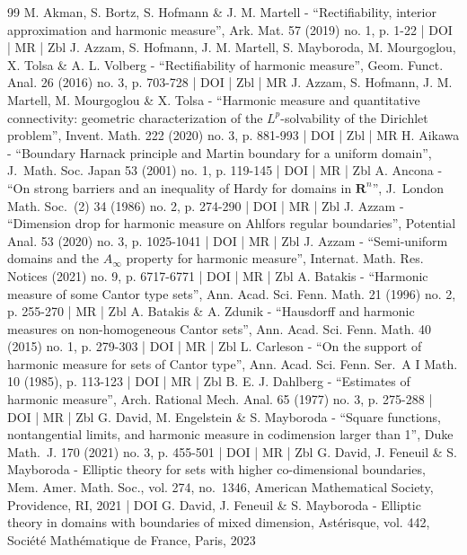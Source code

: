 \documentclass[10pt]{amsart}
\numberwithin{equation}{section}
\theoremstyle{plain}
\theoremstyle{definition}
\begin{document}
\begin{thebibliography}{99}
M. Akman, S. Bortz, S. Hofmann \& J. M. Martell - “Rectifiability, interior approximation and harmonic measure”, Ark. Mat. 57 (2019) no. 1, p. 1-22 | DOI | MR | Zbl
J. Azzam, S. Hofmann, J. M. Martell, S. Mayboroda, M. Mourgoglou, X. Tolsa \& A. L. Volberg - “Rectifiability of harmonic measure”, Geom. Funct. Anal. 26 (2016) no. 3, p. 703-728 | DOI | Zbl | MR
J. Azzam, S. Hofmann, J. M. Martell, M. Mourgoglou \& X. Tolsa - “Harmonic measure and quantitative connectivity: geometric characterization of the $L^p$-solvability of the Dirichlet problem”, Invent. Math. 222 (2020) no. 3, p. 881-993 | DOI | Zbl | MR
H. Aikawa - “Boundary Harnack principle and Martin boundary for a uniform domain”, J. Math. Soc. Japan 53 (2001) no. 1, p. 119-145 | DOI | MR | Zbl
A. Ancona - “On strong barriers and an inequality of Hardy for domains in ${\mathbf{R}}^n$”, J. London Math. Soc. (2) 34 (1986) no. 2, p. 274-290 | DOI | MR | Zbl
J. Azzam - “Dimension drop for harmonic measure on Ahlfors regular boundaries”, Potential Anal. 53 (2020) no. 3, p. 1025-1041 | DOI | MR | Zbl
J. Azzam - “Semi-uniform domains and the $A_\infty $ property for harmonic measure”, Internat. Math. Res. Notices (2021) no. 9, p. 6717-6771 | DOI | MR | Zbl
A. Batakis - “Harmonic measure of some Cantor type sets”, Ann. Acad. Sci. Fenn. Math. 21 (1996) no. 2, p. 255-270 | MR | Zbl
A. Batakis \& A. Zdunik - “Hausdorff and harmonic measures on non-homogeneous Cantor sets”, Ann. Acad. Sci. Fenn. Math. 40 (2015) no. 1, p. 279-303 | DOI | MR | Zbl
L. Carleson - “On the support of harmonic measure for sets of Cantor type”, Ann. Acad. Sci. Fenn. Ser. A I Math. 10 (1985), p. 113-123 | DOI | MR | Zbl
B. E. J. Dahlberg - “Estimates of harmonic measure”, Arch. Rational Mech. Anal. 65 (1977) no. 3, p. 275-288 | DOI | MR | Zbl
G. David, M. Engelstein \& S. Mayboroda - “Square functions, nontangential limits, and harmonic measure in codimension larger than 1”, Duke Math. J. 170 (2021) no. 3, p. 455-501 | DOI | MR | Zbl
G. David, J. Feneuil \& S. Mayboroda - Elliptic theory for sets with higher co-dimensional boundaries, Mem. Amer. Math. Soc., vol. 274, no. 1346, American Mathematical Society, Providence, RI, 2021 | DOI
G. David, J. Feneuil \& S. Mayboroda - Elliptic theory in domains with boundaries of mixed dimension, Astérisque, vol. 442, Société Mathématique de France, Paris, 2023

\end{thebibliography}
\end{document}
